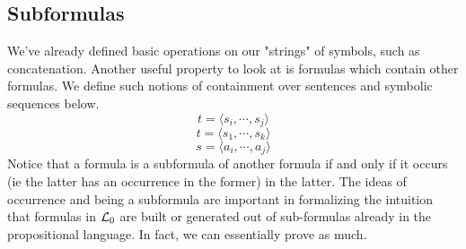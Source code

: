 \documentclass{article}
\begin{document}
\subsection{Subformulas}
We've already defined basic operations on our "strings" of symbols, such as concatenation. Another useful property to look at is formulas which contain other formulas. We define such notions of containment over sentences and symbolic sequences below.
    $$ t = \langle s_i, \cdots, s_j \rangle $$
    $$ t = \langle s_1, \cdots, s_k \rangle $$
    $$ s = \langle a_i, \cdots, a_j \rangle $$
Notice that a formula is a subformula of another formula if and only if it occurs (ie the latter has an occurrence in the former) in the latter. The ideas of occurrence and being a subformula are important in formalizing the intuition that formulas in $ \mathcal{L}_0 $ are built or generated out of sub-formulas already in the propositional language. In fact, we can essentially prove as much.
\end{document}
